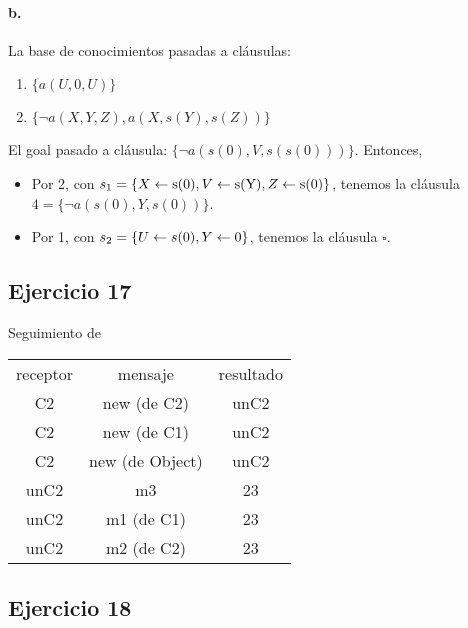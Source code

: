 \paragraph{b.}

La base de conocimientos pasadas a cláusulas:
\begin{enumerate}
  \item $\{a(U,0,U)\}$
  \item $\{\lnot a(X,Y,Z), a(X,s(Y),s(Z))\}$
\end{enumerate}

El goal pasado a cláusula: $\{\lnot a(s(0),V,s(s(0)))\}$. Entonces,

\begin{itemize}
  \item Por 2, con $s_1=\{X\leftarrow \text{s(0)}, V\leftarrow \text{s(Y)}, Z\leftarrow \text{s(0)}\}$, tenemos la cláusula $4 = \{\lnot a(s(0), Y, s(0))\}$.
  \item Por 1, con $s_2=\{U\leftarrow s(0), Y\leftarrow 0\}$, tenemos la cláusula $\square$.
\end{itemize}

\subsection*{Ejercicio 17}

Seguimiento de 

\begin{tabular}{| c | c | c |}
  receptor & mensaje & resultado \\ \hfill
  C2 & new (de C2) & unC2 \\
  C2 & new (de C1) & unC2 \\
  C2 & new (de Object) & unC2 \\
  unC2 & m3 & 23 \\
  unC2 & m1 (de C1) & 23 \\
  unC2 & m2 (de C2) & 23 \\
\end{tabular}

\subsection*{Ejercicio 18}
